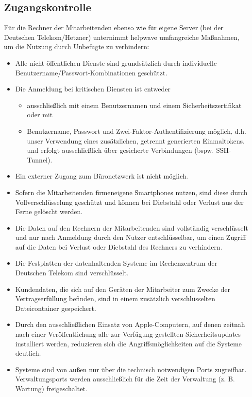 \documentclass[10pt]{article}
\begin{document}
\subsection{Zugangskontrolle}
Für die Rechner der Mitarbeitenden ebenso wie für eigene Server (bei der Deutschen
Telekom/Hetzner) unternimmt helpwave umfangreiche Maßnahmen, um die Nutzung durch
Unbefugte zu verhindern:
\begin{itemize}
	\item Alle nicht-öffentlichen Dienste sind grundsätzlich durch individuelle
	      Benutzername/Passwort-Kombinationen geschützt.
	\item Die Anmeldung bei kritischen Diensten ist entweder
	      \begin{itemize}
		      \item ausschließlich mit einem Benutzernamen und einem Sicherheitszertifikat oder mit
		      \item Benutzername, Passwort und Zwei-Faktor-Authentifizierung möglich, d.h. unser Verwendung eines zusätzlichen, getrennt generierten Einmaltokens. und erfolgt ausschließlich über gesicherte Verbindungen (bspw. SSH-Tunnel).
	      \end{itemize}
	\item Ein externer Zugang zum Büronetzwerk ist nicht möglich.
	\item Sofern die Mitarbeitenden firmeneigene Smartphones nutzen, sind diese durch
	      Vollverschlüsselung geschützt und können bei Diebstahl oder Verlust aus der Ferne
	      gelöscht werden.
	\item Die Daten auf den Rechnern der Mitarbeitenden sind vollständig verschlüsselt und
	      nur nach Anmeldung durch den Nutzer entschlüsselbar, um einen Zugriff auf die
	      Daten bei Verlust oder Diebstahl des Rechners zu verhindern.
	\item Die Festplatten der datenhaltenden Systeme im Rechenzentrum der Deutschen
	      Telekom sind verschlüsselt.
	\item Kundendaten, die sich auf den Geräten der Mitarbeiter zum Zwecke der
	      Vertragserfüllung befinden, sind in einem zusätzlich verschlüsselten Dateicontainer
	      gespeichert.
	\item Durch den ausschließlichen Einsatz von Apple-Computern, auf denen zeitnah nach
	      einer Veröffentlichung alle zur Verfügung gestellten Sicherheitsupdates installiert
	      werden, reduzieren sich die Angriffsmöglichkeiten auf die Systeme deutlich.
	\item Systeme sind von außen nur über die technisch notwendigen Ports zugreifbar.
	      Verwaltungsports werden ausschließlich für die Zeit der Verwaltung (z. B. Wartung)
	      freigeschaltet.
\end{itemize}
\end{document}

